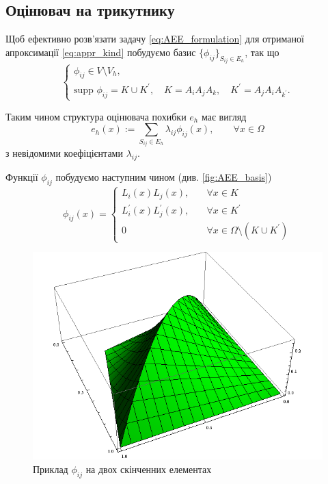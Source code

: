 
\subsection{Оцінювач на трикутнику}

Щоб ефективно розв'язати задачу
\eqref{eq:AEE_formulation} для отриманої апроксимації \eqref{eq:appr_kind} побудуємо базис $\lbrace \phi_{ij} \rbrace_{S_{ij} \in E_h}$, так що
%
\begin{equation}\label{eq:basis_properties}
\begin{cases}
	\phi_{ij} \in V \setminus V_h, \\
	\text{supp } \phi_{ij} = K \cup K^\prime, \quad K = A_iA_jA_k, \quad K^\prime = A_jA_iA_{k^\prime}.
\end{cases}
\end{equation}

Таким чином структура оцінювача похибки $e_h$ має вигляд
%
\begin{equation}
	e_h(x) := \sum \limits_{S_{ij} \in E_h} \lambda_{ij} \phi_{ij}(x), \qquad \forall x \in \Omega
\end{equation}
%
з невідомими коефіцієнтами $\lambda_{ij}$.

Функції $\phi_{ij}$ побудуємо наступним чином (див. \autoref{fig:AEE_basis})
%
\begin{equation}
	\phi_{ij}(x) =
	\begin{cases}
		L_i(x)L_j(x), &\quad \forall x \in K\\
		L_i^\prime(x)L_j^\prime(x), &\quad \forall x \in K^\prime\\
		0 &\quad \forall x \in \Omega \setminus (K \cup K^\prime)
	\end{cases}
\end{equation}
%
\begin{figure}[H]
	\centering
    \includegraphics[scale=0.7]{images/basis}
    \caption{Приклад $\phi_{ij}$ на двох скінченних елементах}
    \label{fig:AEE_basis}
\end{figure}

